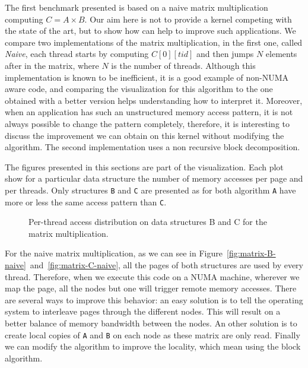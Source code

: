 The first benchmark presented is based on a naive matrix multiplication
computing $C=A \times B$. Our aim here is not to provide a kernel competing with the
state of the art, but to show how \TABARNAC can help to improve such
applications. We compare two implementations of the matrix multiplication, in
the first one, called \emph{Naive}, each thread starts by computing
$C[0][tid]$ and then jumps $N$ elements after in the matrix, where $N$ is the
number of threads. Although this implementation is known to be inefficient, it is a
good example of non-NUMA aware code, and comparing the \TABARNAC visualization
for this algorithm to the one obtained with a better version helps understanding
how to interpret it.
Moreover, when an application has such an unstructured memory access pattern, it
is not always possible to change the pattern completely, therefore, it is
interesting to discuss the improvement we can obtain on this kernel without
modifying the algorithm. The second implementation uses a non recursive block
decomposition.

The figures presented in this sections are part of the \TABARNAC visualization.
Each plot show for a particular data structure the number of memory accesses
per page and per threads. Only structures \texttt{B} and \texttt{C} are
presented as for both algorithm \texttt{A} have more or less the same access
pattern than \texttt{C}.

\begin{figure}[htb]
    \centering
    \caption{Per-thread access distribution on data structures B and C for the
    matrix multiplication.}
\end{figure}

For the naive matrix multiplication, as we can see in
Figure~\ref{fig:matrix-B-naive}~and~\ref{fig:matrix-C-naive}, all the pages of both structures are used by every
thread. Therefore, when we execute this code on a NUMA machine, wherever we
map the page, all the nodes but one will trigger remote memory accesses. There
are several ways to improve this behavior: an easy solution
is to tell the operating system to interleave pages through the different
nodes. This will result on a better balance of memory bandwidth between the
nodes. An other solution is to create local copies of \texttt{A} and
\texttt{B} on each node as these matrix are only read. Finally we can modify
the algorithm to improve the locality, which mean using the block algorithm.

